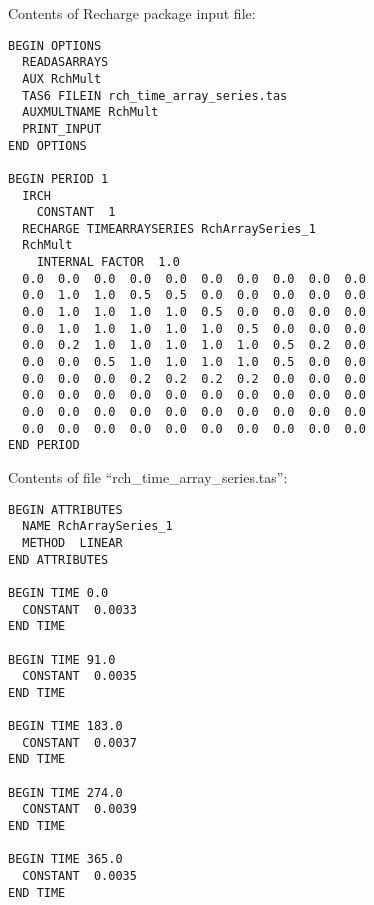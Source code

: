 \vspace{5 mm}

Contents of Recharge package input file:

\begin{lstlisting}[style=inputfile]
BEGIN OPTIONS
  READASARRAYS
  AUX RchMult 
  TAS6 FILEIN rch_time_array_series.tas
  AUXMULTNAME RchMult
  PRINT_INPUT
END OPTIONS

BEGIN PERIOD 1
  IRCH
    CONSTANT  1
  RECHARGE TIMEARRAYSERIES RchArraySeries_1
  RchMult
    INTERNAL FACTOR  1.0
  0.0  0.0  0.0  0.0  0.0  0.0  0.0  0.0  0.0  0.0
  0.0  1.0  1.0  0.5  0.5  0.0  0.0  0.0  0.0  0.0
  0.0  1.0  1.0  1.0  1.0  0.5  0.0  0.0  0.0  0.0
  0.0  1.0  1.0  1.0  1.0  1.0  0.5  0.0  0.0  0.0
  0.0  0.2  1.0  1.0  1.0  1.0  1.0  0.5  0.2  0.0
  0.0  0.0  0.5  1.0  1.0  1.0  1.0  0.5  0.0  0.0
  0.0  0.0  0.0  0.2  0.2  0.2  0.2  0.0  0.0  0.0
  0.0  0.0  0.0  0.0  0.0  0.0  0.0  0.0  0.0  0.0
  0.0  0.0  0.0  0.0  0.0  0.0  0.0  0.0  0.0  0.0
  0.0  0.0  0.0  0.0  0.0  0.0  0.0  0.0  0.0  0.0
END PERIOD
\end{lstlisting}

Contents of file ``rch\_time\_array\_series.tas'':

\begin{lstlisting}[style=inputfile]
BEGIN ATTRIBUTES
  NAME RchArraySeries_1
  METHOD  LINEAR
END ATTRIBUTES

BEGIN TIME 0.0
  CONSTANT  0.0033
END TIME

BEGIN TIME 91.0
  CONSTANT  0.0035
END TIME

BEGIN TIME 183.0
  CONSTANT  0.0037
END TIME

BEGIN TIME 274.0
  CONSTANT  0.0039
END TIME

BEGIN TIME 365.0
  CONSTANT  0.0035
END TIME
\end{lstlisting}



